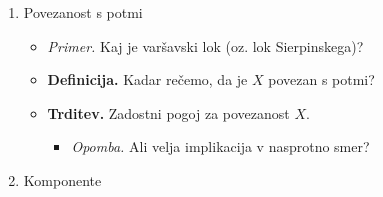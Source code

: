 \begin{enumerate}
    \item Povezanost s potmi
    \begin{itemize}
        \item \colorbox{yellow!30}{\emph{Primer.}} Kaj je varšavski lok (oz. lok Sierpinskega)?
        \item \colorbox{purple!30}{\textbf{Definicija.}} Kadar rečemo, da je $X$ povezan s potmi?
        \item \colorbox{blue!30}{\textbf{Trditev.}} Zadostni pogoj za povezanost $X$.
        \begin{itemize}
            \item \colorbox{yellow!30}{\emph{Opomba.}} Ali velja implikacija v nasprotno smer?
        \end{itemize}
    \end{itemize}

    \item Komponente
\end{enumerate}